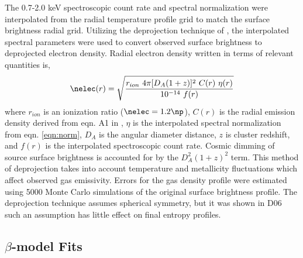 The 0.7-2.0 keV spectroscopic count rate and spectral normalization
were interpolated from the radial temperature profile grid to match
the surface brightness radial grid. Utilizing the deprojection
technique of \citet{kriss83}, the interpolated spectral parameters
were used to convert observed surface brightness to deprojected
electron density. Radial electron density written in terms of relevant
quantities is,
\begin{equation}
\nelec(r) = \sqrt{\frac{r_{ion}~4 \pi [D_A(1+z)]^2~C(r)~\eta(r)}{10^{-14}~f(r)}}
\end{equation}
where $r_{ion}$ is an ionization ratio ($\nelec=1.2\np$), $C(r)$ is
the radial emission density derived from eqn. A1 in \citet{kriss83},
$\eta$ is the interpolated spectral normalization from
eqn. \ref{eqn:norm}, $D_A$ is the angular diameter distance, $z$ is
cluster redshift, and $f(r)$ is the interpolated spectroscopic count
rate. Cosmic dimming of source surface brightness is accounted for by
the $D_A^2 (1+z)^2$ term. This method of deprojection takes into
account temperature and metallicity fluctuations which affect observed
gas emissivity. Errors for the gas density profile were estimated
using 5000 Monte Carlo simulations of the original surface brightness
profile. The \citet{kriss83} deprojection technique assumes spherical
symmetry, but it was shown in D06 such an assumption has little effect
on final entropy profiles.

\subsection{$\beta$-model Fits}
\label{sec:entsuppbeta}

